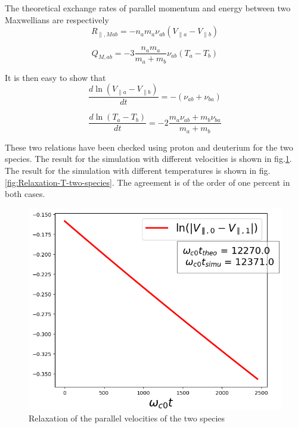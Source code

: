 \documentclass[11pt,preprint]{elsarticle}
\begin{document}
The theoretical exchange rates of parallel momentum and energy between two Maxwellians are respectively
\[
R_{\parallel,Mab}=-n_{a}m_{a}\nu_{ab}\left(V_{\parallel a}-V_{\parallel b}\right)
\]


\[
Q_{M,ab}=-3\frac{n_{a}m_{a}}{m_{a}+m_{b}}\nu_{ab}\left(T_{a}-T_{b}\right)
\]


It is then easy to show that 
\[
\frac{d\ln\left(V_{\parallel a}-V_{\parallel b}\right)}{dt}=-\left(\nu_{ab}+\nu_{ba}\right)
\]


\[
\frac{d\ln\left(T_{a}-T_{b}\right)}{dt}=-2\frac{m_{a}\nu_{ab}+m_{b}\nu_{ba}}{m_{a}+m_{b}}
\]


These two relations have been checked using proton and deuterium for the two species. The result for the simulation with different velocities is shown in fig.\ref{fig:Relaxation-Vpar-two-species}. The result for the simulation with different temperatures is shown in fig.\ref{fig:Relaxation-T-two-species}. The agreement is of the order of one percent in both cases.

\begin{figure}[H]
\caption{Relaxation of the parallel velocities of the two species \label{fig:Relaxation-Vpar-two-species}}
\centering{}\includegraphics[scale=0.8]{Figures/2_species_velocities.PNG}
\end{figure}
\end{document}
